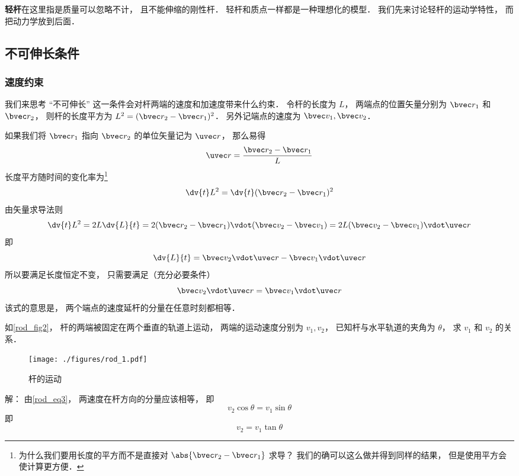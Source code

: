 

\textbf{轻杆}在这里指是质量可以忽略不计， 且不能伸缩的刚性杆． 轻杆和质点一样都是一种理想化的模型． 我们先来讨论轻杆的运动学特性， 而把动力学放到后面．

\subsection{不可伸长条件}
\subsubsection{速度约束}
我们来思考 “不可伸长” 这一条件会对杆两端的速度和加速度带来什么约束． 令杆的长度为 $L$， 两端点的位置矢量分别为 $\bvec r_1$ 和 $\bvec r_2$， 则杆的长度平方为 $L^2 = (\bvec r_2 - \bvec r_1)^2$． 另外记端点的速度为 $\bvec v_1, \bvec v_2$．

如果我们将 $\bvec r_1$ 指向 $\bvec r_2$ 的单位矢量记为 $\uvec r$， 那么易得
\begin{equation}\label{rod_eq7}
\uvec r = \frac{\bvec r_2 - \bvec r_1}{L}
\end{equation}
长度平方随时间的变化率为\footnote{为什么我们要用长度的平方而不是直接对 $\abs{\bvec r_2 - \bvec r_1}$ 求导？ 我们的确可以这么做并得到同样的结果， 但是使用平方会使计算更方便．}
\begin{equation}\label{rod_eq2}
\dv{t} L^2 = \dv{t} (\bvec r_2 - \bvec r_1)^2
\end{equation}
由矢量求导法则
\begin{equation}\label{rod_eq1}
\dv{t} L^2 = 2L \dv{L}{t} = 2 (\bvec r_2 - \bvec r_1) \vdot (\bvec v_2 - \bvec v_1) = 2L (\bvec v_2 - \bvec v_1) \vdot \uvec r
\end{equation}
即
\begin{equation}\label{rod_eq6}
\dv{L}{t} = \bvec v_2 \vdot \uvec r - \bvec v_1 \vdot \uvec r
\end{equation}
所以要满足长度恒定不变， 只需要满足（充分必要条件）
\begin{equation}\label{rod_eq3}
\bvec v_2 \vdot \uvec r = \bvec v_1 \vdot \uvec r
\end{equation}
该式的意思是， 两个端点的速度延杆的分量在任意时刻都相等．

\begin{example}{}\label{rod_ex1}
如\autoref{rod_fig2}， 杆的两端被固定在两个垂直的轨道上运动， 两端的运动速度分别为 $v_1, v_2$， 已知杆与水平轨道的夹角为 $\theta$， 求 $v_1$ 和 $v_2$ 的关系．
\begin{figure}[ht]
\centering
\texttt{[image: ./figures/rod\_1.pdf]}
\caption{杆的运动} \label{rod_fig1}
\end{figure}
解： 由\autoref{rod_eq3}， 两速度在杆方向的分量应该相等， 即
\begin{equation}
v_2 \cos\theta = v_1 \sin\theta
\end{equation}
即
\begin{equation}
v_2 = v_1 \tan\theta
\end{equation}
\end{example}

